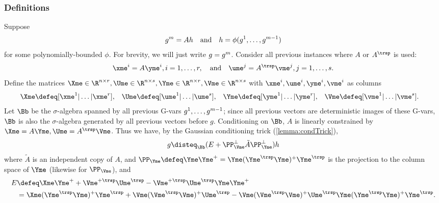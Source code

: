 \documentclass[main.tex]{subfiles}
\begin{document}
\subsubsection{Definitions}
Suppose
\begin{align}
    g^{m} = A h \quad \text{and} \quad h = \phi(g^{1}, \ldots, g^{m - 1})
    \label{eqn:gAh}
\end{align}
for some polynomially-bounded $\phi$.
For brevity, we will just write $g = g^{m}$.
Consider all previous instances where $A$ or $A^\trsp$ is used: 
\begin{equation}
  \xme^{i} = A \yme^{i}, i = 1, \ldots, r, \quad\text{and}\quad
  \ume^{j} = A^\trsp \vme^{j}, j = 1, \ldots, s.
  \label{eqn:xAy&uATv}
\end{equation}
Define the matrices $\Xme \in \R^{n\times r}, \Ume \in \R^{n \times s}, \Yme \in \R^{n \times r}, \Vme \in \R^{n \times s}$ with $\xme^i, \ume^i, \yme^i, \vme^i$ as columns
\begin{align}
\Xme &\defeq [\xme^1| \ldots| \xme^{r}],&
\Ume &\defeq [\ume^1| \ldots| \ume^{s}],&
\Yme &\defeq [\yme^1| \ldots| \yme^r],&
\Vme &\defeq [\vme^1| \ldots| \vme^s]
.
\label{eqn:XUYZ}
\end{align}
Let $\Bb$ be the $\sigma$-algebra spanned by all previous G-vars $g^1, \ldots, g^{m-1}$; since all previous vectors are deterministic images of these G-vars, $\Bb$ is also the $\sigma$-algebra generated by all previous vectors before $g$.
Conditioning on $\Bb$, $A$ is linearly constrained by $\Xme = A\Yme, \Ume = A^\trsp \Vme$.
Thus we have, by the Gaussian conditioning trick (\cref{lemma:condTrick}),
\begin{align}
    g \disteq_{\Bb} (E + \PP_{\Vme}^\perp \tilde A \PP_{\Yme}^\perp) h
    \label{eqn:gCondTrick}
\end{align}
where
$\tilde A$ is an independent copy of $A$, and $\PP_{\Yme} \defeq \Yme \Yme^+ = \Yme(\Yme^\trsp \Yme)^+ \Yme^\trsp$ is the projection to the column space of $\Yme$ (likewise for $\PP_{\Vme}$), and
\begin{equation}
  \begin{aligned}
  E
      &\defeq
          \Xme \Yme^+
          + \Vme^{+\trsp} \Ume^{\trsp}
          - \Vme^{+\trsp} \Ume^\trsp \Yme \Yme^+
          \\
      &=
          \Xme (\Yme^\trsp \Yme)^+ \Yme^{\trsp}
          + \Vme (\Vme^{\trsp} \Vme)^+ \Ume^{\trsp}
          - \Vme (\Vme^{\trsp} \Vme)^+ \Ume^\trsp \Yme (\Yme^\trsp \Yme)^+ \Yme^\trsp.
  \end{aligned}
  \label{eqn:Eexpansion}
\end{equation}
\end{document}

